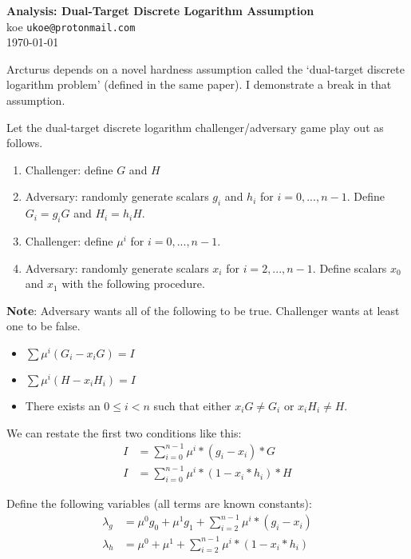 \textbf{Analysis: Dual-Target Discrete Logarithm Assumption}\\
koe \texttt{ukoe@protonmail.com}\\
\today

Arcturus \cite{arcturus} depends on a novel hardness assumption called the `dual-target discrete logarithm problem' (defined in the same paper). I demonstrate a break in that assumption.

Let the dual-target discrete logarithm challenger/adversary game play out as follows.

\begin{enumerate}
    \item Challenger: define $G$ and $H$

    \item Adversary: randomly generate scalars $g_i$ and $h_i$ for $i = 0,...,n-1$. Define $G_i = g_i G$ and $H_i = h_i H$.

    \item Challenger: define $\mu^i$ for $i = 0,...,n-1$.

    \item Adversary: randomly generate scalars $x_i$ for $i = 2,...,n-1$. Define scalars $x_0$ and $x_1$ with the following procedure.
\end{enumerate}

\textbf{Note}: Adversary wants all of the following to be true. Challenger wants at least one to be false.

\begin{itemize}
    \item \(\sum \mu^i (G_i - x_i G) = I\)
    \item \(\sum \mu^i (H - x_i H_i) = I\)
    \item There exists an $0 \leq i < n$ such that either $x_i G \neq G_i$ or $x_i H_i \neq H$.
\end{itemize}

We can restate the first two conditions like this:
\begin{align}
    I &= \sum^{n - 1}_{i = 0} \mu^i * ( g_i - x_i) * G \\
    I &= \sum^{n - 1}_{i = 0} \mu^i*(1 - x_i * h_i) * H
\end{align}

Define the following variables (all terms are known constants):
\begin{align}
    \lambda_g &= \mu^0 g_0 + \mu^1 g_1 + \sum^{n - 1}_{i = 2} \mu^i * (g_i - x_i) \\
    \lambda_h &= \mu^0 + \mu^1 + \sum^{n - 1}_{i = 2} \mu^i * (1 - x_i * h_i)
\end{align}

